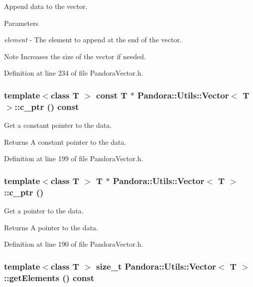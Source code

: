 Append data to the vector. 
\begin{DoxyParams}{Parameters}
\item[{\em element}]-\/ The element to append at the end of the vector. \end{DoxyParams}
\begin{DoxyNote}{Note}
Increases the size of the vector if needed. 
\end{DoxyNote}


Definition at line 234 of file PandoraVector.h.\hypertarget{classPandora_1_1Utils_1_1Vector_a8ee2539ddb6b94eff47b6453143b2b83}{
\subsubsection[{c\_\-ptr}]{\setlength{\rightskip}{0pt plus 5cm}template$<$class T $>$ const T $\ast$ {\bf Pandora::Utils::Vector}$<$ T $>$::c\_\-ptr () const}}
\label{classPandora_1_1Utils_1_1Vector_a8ee2539ddb6b94eff47b6453143b2b83}


Get a constant pointer to the data. \begin{DoxyReturn}{Returns}
A constant pointer to the data. 
\end{DoxyReturn}


Definition at line 199 of file PandoraVector.h.\hypertarget{classPandora_1_1Utils_1_1Vector_a9760f625847909ad7dc45a71742bbcc9}{
\subsubsection[{c\_\-ptr}]{\setlength{\rightskip}{0pt plus 5cm}template$<$class T $>$ T $\ast$ {\bf Pandora::Utils::Vector}$<$ T $>$::c\_\-ptr ()}}
\label{classPandora_1_1Utils_1_1Vector_a9760f625847909ad7dc45a71742bbcc9}


Get a pointer to the data. \begin{DoxyReturn}{Returns}
A pointer to the data. 
\end{DoxyReturn}


Definition at line 190 of file PandoraVector.h.\hypertarget{classPandora_1_1Utils_1_1Vector_a4d21fd9aff673df56471a9724b36fe2c}{
\subsubsection[{getElements}]{\setlength{\rightskip}{0pt plus 5cm}template$<$class T $>$ size\_\-t {\bf Pandora::Utils::Vector}$<$ T $>$::getElements () const}}
\label{classPandora_1_1Utils_1_1Vector_a4d21fd9aff673df56471a9724b36fe2c}


